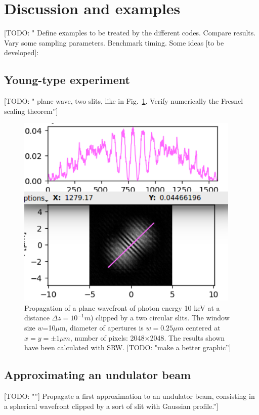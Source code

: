 \documentclass{iucr}              %
\newcommand{\todo}[1]{{\color{red}[TODO: "#1'']}}
\begin{document}
\section{Discussion and examples}
\label{ch: discussion}

\todo{
Define examples to be treated by the different codes. Compare results. Vary some sampling parameters. Benchmark timing. Some ideas [to be developed]: 


\subsection{Young-type experiment}
\todo{ plane wave, two slits, like in Fig.~\ref{fig: srw two slits}. Verify numerically the Fresnel scaling theorem}

\begin{figure}
\label{fig: srw two slits}
\caption{Propagation of a plane wavefront of photon energy 10 keV at a distance $\Delta z = 10^{-1}m$) clipped by a two circular slits. The window size $w$=10$\mu$m, diameter of apertures is $w=0.25\mu m$ centered at $x=y=\pm 1 \mu m$, number of pixels: 2048$\times$2048. The results shown have been calculated with SRW. \todo{make a better graphic}
}
\includegraphics[width=0.95\textwidth]{srw_two_slits.png}
\end{figure}

\subsection{Approximating an undulator beam}
\todo{}
Propagate a first approximation to an undulator beam, consisting in a spherical wavefront clipped by a sort of slit with Gaussian profile.}
\end{document}
